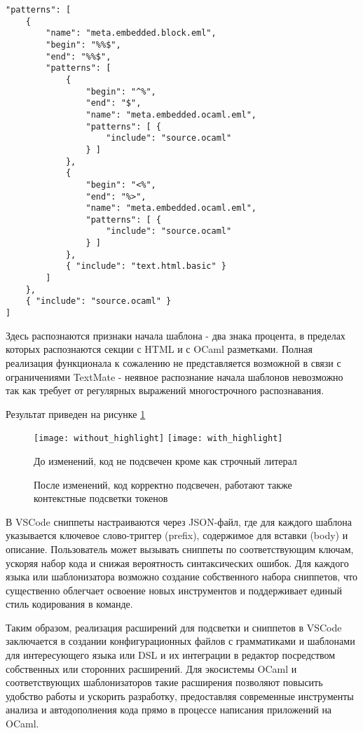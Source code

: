 \begin{lstlisting}
"patterns": [
    {
        "name": "meta.embedded.block.eml",
        "begin": "%%$",
        "end": "%%$",
        "patterns": [
            {
                "begin": "^%",
                "end": "$",
                "name": "meta.embedded.ocaml.eml",
                "patterns": [ {
                    "include": "source.ocaml"
                } ]
            },
            {
                "begin": "<%",
                "end": "%>",
                "name": "meta.embedded.ocaml.eml",
                "patterns": [ { 
                    "include": "source.ocaml"
                } ]
            },
            { "include": "text.html.basic" }
        ]
    },
    { "include": "source.ocaml" }
]
\end{lstlisting}

Здесь распознаются признаки начала шаблона - два знака процента, в пределах которых распознаются секции с HTML и с OCaml разметками.
Полная реализация функционала к сожалению не представляется возможной в связи с ограничениями TextMate - неявное распознание начала шаблонов невозможно так как требует от регулярных выражений многострочного распознавания.

Результат приведен на рисунке \ref{fig:with}

\begin{figure}[h!]
    \texttt{[image: without\_highlight]}\hfill
    \texttt{[image: with\_highlight]}\hfill
    \caption{До изменений, код не подсвечен кроме как строчный литерал}
    \label{fig:without}
    \caption{После изменений, код корректно подсвечен, работают также контекстные подсветки токенов}
    \label{fig:with}
\end{figure}

В VSCode сниппеты настраиваются через JSON-файл, где для каждого шаблона указывается ключевое слово-триггер (prefix), содержимое для вставки (body) и описание.
Пользователь может вызывать сниппеты по соответствующим ключам, ускоряя набор кода и снижая вероятность синтаксических ошибок.
Для каждого языка или шаблонизатора возможно создание собственного набора сниппетов, что существенно облегчает освоение новых инструментов и поддерживает единый стиль кодирования в команде.

Таким образом, реализация расширений для подсветки и сниппетов в VSCode заключается в создании конфигурационных файлов с грамматиками и шаблонами для интересующего языка или DSL и их интеграции в редактор посредством собственных или сторонних расширений.
Для экосистемы OCaml и соответствующих шаблонизаторов такие расширения позволяют повысить удобство работы и ускорить разработку, предоставляя современные инструменты анализа и автодополнения кода прямо в процессе написания приложений на OCaml.

